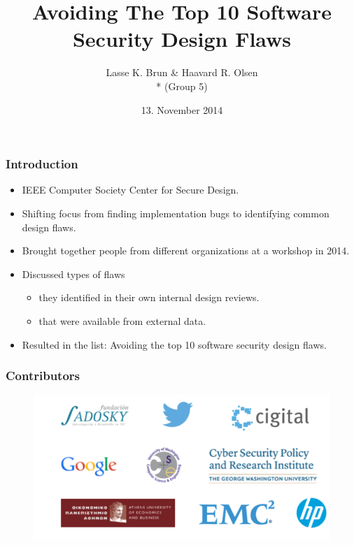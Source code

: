 \documentclass[12pt,norsk]{beamer}
\title[Avoiding The Top 10 Software Security Design Flaws]{Avoiding The Top 10 Software Security Design Flaws}
\author{Lasse K. Brun \& Haavard R. Olsen \\* (Group 5)} %
\institute[UiB]
{
\medskip
\textit{lkbrun@gmail.com \& haavard.olsen@live.com} \\* %
\textit{INF226 - Software Security, Fall 2014 }
}
\date{13. November 2014} %
\begin{document}
 

\begin{frame}
\titlepage %
\end{frame}


\begin{frame}
	
	\frametitle{Introduction}

	\begin{itemize}
		\item IEEE Computer Society Center for Secure Design.
		\item Shifting focus from finding implementation bugs to identifying common design flaws.
		\item Brought together people from different organizations at a workshop in 2014.
		\item Discussed types of flaws
		\begin{itemize}
			\item they identified in their own internal design reviews.
			\item that were available from external data.
		\end{itemize}
		\item Resulted in the list: Avoiding the top 10 software security design flaws.
	\end{itemize}		

\end{frame}


\begin{frame}
	
	\frametitle{Contributors}
	
	\begin{figure}[h]
    \centering
    \includegraphics[scale=0.50]{images/contributors.png}
    
\end{figure}
	
\end{frame}
\end{document}
